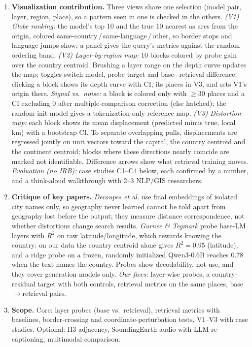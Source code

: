 \documentclass[10pt]{article}
\newcommand{\head}[1]{\par\vspace{3pt}{\large\bfseries #1}\par\vspace{1pt}}
\begin{document}
\head{Response to feedback}
\begin{enumerate}[label=\textbf{\arabic*.}]
\item \textbf{Visualization contribution.} Three views share one selection (model pair, layer, region, place), so a pattern seen in one is checked in the others.
\emph{(V1) Globe ranking:} the model's top 10 and the true 10 nearest as arcs from the origin, colored same-country\,/\,same-language\,/\,other, so border stops and language jumps show; a panel gives the query's metrics against the random-ordering band.
\emph{(V2) Layer-by-region map:} 10\textdegree{} blocks colored by probe gain over the country centroid. Brushing a layer range on the depth curve updates the map; toggles switch model, probe target and base$-$retrieval difference; clicking a block shows its depth curve with CI, its places in V3, and sets V1's origin there. \emph{Signal vs.\ noise:} a block is colored only with $\ge$30 places and a CI excluding 0 after multiple-comparison correction (else hatched); the random-init model gives a tokenization-only reference map.
\emph{(V3) Distortion map:} each block shows its mean displacement (predicted minus true, local km) with a bootstrap CI. To separate overlapping pulls, displacements are regressed jointly on unit vectors toward the capital, the country centroid and the continent centroid; blocks where these directions nearly coincide are marked not identifiable. Difference arrows show what retrieval training moves.
\emph{Evaluation (no IRB):} case studies C1--C4 below, each confirmed by a number, and a think-aloud walkthrough with 2--3 NLP/GIS researchers.
\item \textbf{Critique of key papers.} \emph{Decoupes et al.} use final embeddings of isolated city names only, so geography never learned cannot be told apart from geography lost before the output; they measure distance correspondence, not whether distortions change search results. \emph{Gurnee \& Tegmark} probe base-LM layers with $R^2$ on raw latitude/longitude, which rewards knowing the country: on our data the country centroid alone gives $R^2=0.95$ (latitude), and a ridge probe on a frozen, randomly initialized Qwen3-0.6B reaches 0.78 when the text names the country. Probes show decodability, not use, and they cover generation models only. \emph{Our fixes:} layer-wise probes, a country-residual target with both controls, retrieval metrics on the same places, base$\to$retrieval pairs.
\item \textbf{Scope.} Core: layer probes (base vs.\ retrieval), retrieval metrics with baselines, border-crossing and coordinate-perturbation tests, V1--V3 with case studies. Optional: H3 adjacency, SoundingEarth audio with LLM re-captioning, multimodal comparison.

\end{enumerate}
\end{document}
